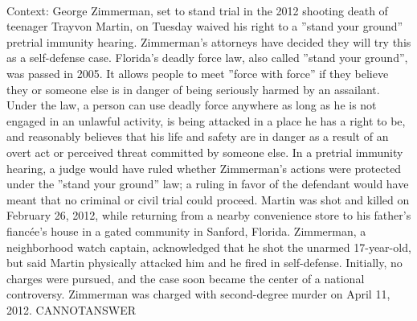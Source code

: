 \documentclass[11pt,a4paper, onecolumn]{article}
\begin{document}
\\ Context: George Zimmerman, set to stand trial in the 2012 shooting death of teenager Trayvon Martin, on Tuesday waived his right to a ''stand your ground'' pretrial immunity hearing. Zimmerman's attorneys have decided they will try this as a self-defense case. Florida's deadly force law, also called ''stand your ground'', was passed in 2005. It allows people to meet ''force with force'' if they believe they or someone else is in danger of being seriously harmed by an assailant. Under the law, a person can use deadly force anywhere as long as he is not engaged in an unlawful activity, is being attacked in a place he has a right to be, and reasonably believes that his life and safety are in danger as a result of an overt act or perceived threat committed by someone else. In a pretrial immunity hearing, a judge would have ruled whether Zimmerman's actions were protected under the ''stand your ground'' law; a ruling in favor of the defendant would have meant that no criminal or civil trial could proceed. Martin was shot and killed on February 26, 2012, while returning from a nearby convenience store to his father's fiancée's house in a gated community in Sanford, Florida. Zimmerman, a neighborhood watch captain, acknowledged that he shot the unarmed 17-year-old, but said Martin physically attacked him and he fired in self-defense. Initially, no charges were pursued, and the case soon became the center of a national controversy. Zimmerman was charged with second-degree murder on April 11, 2012. CANNOTANSWER
\end{document}
